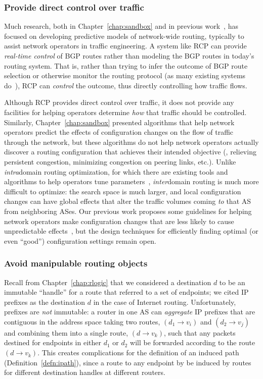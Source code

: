 \subsubsection{Provide direct control over traffic}

Much research, both in Chapter~\ref{chap:sandbox} and in previous
work~\cite{Feldmann2000}, has focused on developing predictive models of
network-wide routing, typically to assist network operators in traffic
engineering. A system like RCP can provide {\em real-time control\/} of
BGP routes rather than modeling the BGP routes in today's routing
system.  That is, rather than trying to infer the outcome of BGP route
selection or otherwise monitor the routing protocol (as many existing
systems do~\cite{www-ipsumnetworks,www-packetdesign, Shaikh2004}), RCP
can {\em control} the outcome, thus directly controlling how traffic
flows.

Although RCP provides direct control over traffic, it does not provide
any facilities for helping operators determine {\em how} that traffic
should be controlled.  Similarly, Chapter~\ref{chap:sandbox} presented
algorithms that help network operators predict the effects of
configuration changes on the flow of traffic through the network, but
these algorithms do not help network operators actually discover a
routing configuration that achieves their intended objective (\eg,
relieving persistent congestion, minimizing congestion on peering links,
etc.).  Unlike {\em intra}domain routing optimization, for which there
are existing tools and algorithms to help operators tune
parameters~\cite{www-cariden-mate,Feldmann2000}, {\em inter}domain routing is
much more difficult to optimize: the search space is much larger, and
local configuration changes can have global effects that alter the
traffic volumes coming {\em to} that AS from neighboring ASes.  Our
previous work proposes some guidelines for helping network operators
make configuration changes that are less likely to cause unpredictable
effects~\cite{Feamster2003e}, but the design techniques for efficiently finding
optimal (or even ``good'') configuration settings remain open.


\subsubsection{Avoid manipulable routing objects}

Recall from Chapter~\ref{chap:rlogic} that we considered a destination
$d$ to be an immutable ``handle'' for a route that referred to a set of
endpoints; we cited IP prefixes as the destination $d$ in
the case of Internet routing.  Unfortunately, prefixes are {\em not}
immutable: a router in one AS can {\em aggregate} IP prefixes that are
contiguous in 
the address space taking two routes, $(d_1 \rightarrow v_i)$ and $(d_2
\rightarrow v_j)$ and combining them into a single route, $(d
\rightarrow v_k)$, such that any packets destined for endpoints in
either $d_1$ or 
$d_2$ will be forwarded according to the route $(d\rightarrow v_k)$.
This creates complications for the definition of an induced path
(Definition~\ref{defn:ipath}), since a route to any endpoint by be
induced by routes for different destination handles at different
routers.

